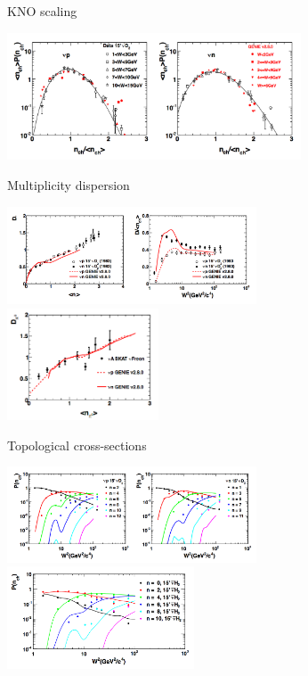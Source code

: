 \begin{frame}{KNO scaling}
\begin{center}
\includegraphics[width=330px]{./images/nuint/dis/kno.png}
\end{center}
\end{frame}

\begin{frame}{Multiplicity dispersion}
\begin{center}
\includegraphics[width=280px]{./images/nuint/dis/dispersion_ch.png}\\
\includegraphics[width=170px]{./images/nuint/dis/dispersion_pi0.png}\\
\end{center}
\end{frame}

\begin{frame}{Topological cross-sections}
\begin{center}
\includegraphics[width=280px]{./images/nuint/dis/topological_xsecs.png}\\
\includegraphics[width=210px]{./images/nuint/dis/topological_xsecs_nubar.png}\\
\end{center}
\end{frame}




